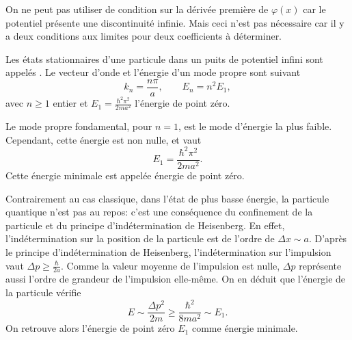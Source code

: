 \documentclass[12pt,fancy]{cours}
\begin{document}
\begin{remarque}
On ne peut pas utiliser de condition sur la dérivée première de $\varphi(x)$ car le potentiel présente une discontinuité infinie. Mais ceci n'est pas nécessaire car il y a deux conditions aux limites pour deux coefficients à déterminer.
\end{remarque}

\begin{prop}\label{prop:}
Les états stationnaires d'une particule  dans un puits de potentiel infini sont appelés . Le vecteur d'onde et l'énergie d'un mode propre sont  suivant
\begin{equation*}
  k_n=\frac{n\pi}{a}, \qquad E_n=n^2E_1, 
\end{equation*}
avec $n\geq1$ entier et $E_1=\frac{\hbar^2\pi^2}{2m a^2}$ l'énergie de point zéro.
\end{prop}

 Le mode propre fondamental, pour $n=1$, est le mode d'énergie la plus faible. Cependant, cette énergie est non nulle, et vaut
\begin{equation}
  E_1=\frac{\hbar^2\pi^2}{2m a^2}.
\end{equation}
Cette énergie minimale est appelée énergie de point zéro. 

Contrairement au cas classique, dans l'état de plus basse énergie, la particule quantique n'est pas au repos: c'est une conséquence du confinement de la particule et du principe d'indétermination de Heisenberg. En effet, l'indétermination sur la position de la particule est de l'ordre de $\Delta x \sim a$. D'après le principe d'indétermination de Heisenberg, l'indétermination sur l'impulsion vaut $\Delta p \geq \frac{\hbar}{2a}$. Comme la valeur moyenne de l'impulsion est nulle, $\Delta p$ représente aussi l'ordre de grandeur de l'impulsion elle-même. On en déduit que l'énergie de la particule vérifie
\begin{equation}
E\sim\frac{\Delta p^2}{2m}\geq \frac{\hbar^2}{8ma^2}\sim E_1.
\end{equation}
On retrouve alors l'énergie de point zéro $E_1$ comme énergie minimale.

\end{document}
